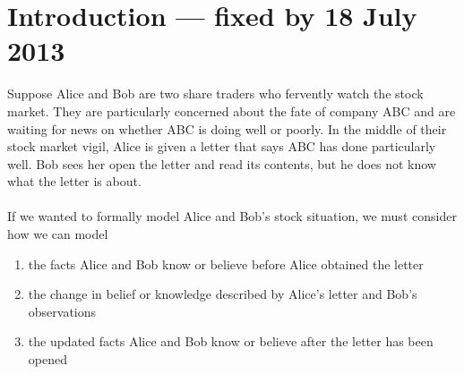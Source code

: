\section{Introduction --- fixed by 18 July 2013}

% 
% 
% 

Suppose Alice and Bob are two share traders who fervently watch the stock market. They
are particularly concerned about the fate of company ABC and are waiting for news on whether ABC is
doing well or poorly. In the middle of their stock market vigil, Alice is given a letter that says
ABC has done particularly well. Bob sees her open the letter and read its contents, but he does not
know what the letter is about.\\
\\
If we wanted to formally model Alice and Bob's stock situation, we must consider how we can model
\begin{enumerate}
	\item the facts Alice and Bob know or believe before Alice obtained the letter
	\item the change in belief or knowledge described by Alice's letter and Bob's observations
	\item the updated facts Alice and Bob know or believe after the letter has been opened
\end{enumerate}

